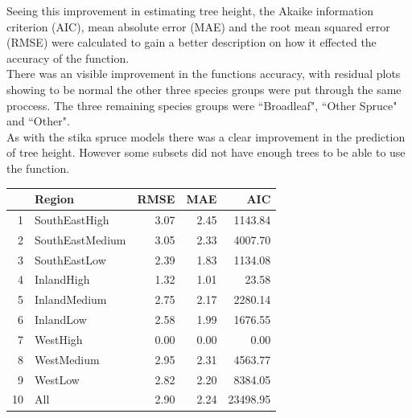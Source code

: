 \documentclass[a4paper,11pt,twoside]{report}
\begin{document}
Seeing this improvement in estimating tree height, the Akaike information criterion (AIC), mean absolute error (MAE) and the root mean squared error (RMSE) were calculated to gain a better description on how it effected the accuracy of the function.\\

There was an visible improvement in the functions accuracy, with residual plots showing to be normal the other three species groups were put through the same proccess.
The three remaining species groups were ``Broadleaf", ``Other Spruce" and ``Other". \\

As with the stika spruce models there was a clear improvement in the prediction of tree height. However some subsets did not have enough trees to be able to use the function. 
\begin{table}[ht]
\centering
{} \label{tab:Stika Spruce} 
\begin{tabular}{rlrrr}
  \hline
 & Region & RMSE & MAE & AIC \\ 
  \hline
1 & SouthEastHigh & 3.07 & 2.45 & 1143.84 \\ 
  2 & SouthEastMedium & 3.05 & 2.33 & 4007.70 \\ 
  3 & SouthEastLow & 2.39 & 1.83 & 1134.08 \\ 
  4 & InlandHigh & 1.32 & 1.01 & 23.58 \\ 
  5 & InlandMedium & 2.75 & 2.17 & 2280.14 \\ 
  6 & InlandLow & 2.58 & 1.99 & 1676.55 \\ 
  7 & WestHigh & 0.00 & 0.00 & 0.00 \\ 
  8 & WestMedium & 2.95 & 2.31 & 4563.77 \\ 
  9 & WestLow & 2.82 & 2.20 & 8384.05 \\ 
  10 & All & 2.90 & 2.24 & 23498.95 \\ 
   \hline
\end{tabular}
\end{table}
\end{document}
